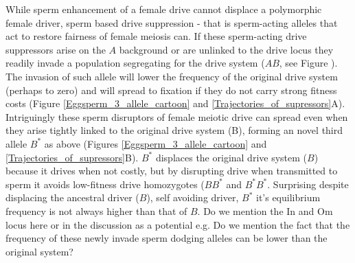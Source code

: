 \documentclass[12pt,letterpaper]{article}
\newcommand{\gc}[1]{{ \color{red} #1}}
\begin{document}
While  sperm enhancement of a female drive cannot displace a polymorphic female driver, sperm based drive suppression - that is sperm-acting alleles that act to restore 
fairness of female meiosis can. 
 If these sperm-acting drive suppressors arise on
	the $A$ background or are unlinked to the drive locus they readily invade a population segregating
for the drive system ($AB$, see Figure ). The invasion of such allele
will lower the frequency of the original drive system (perhaps to zero)
and will spread to fixation if they do not carry strong fitness costs
(Figure \ref{Eggsperm_3_allele_cartoon} and \ref{Trajectories_of_supressors}A). \\

Intriguingly these sperm disruptors of female meiotic drive can spread
	even when they arise tightly linked to the original drive system (B), forming
	an novel third allele $B^*$ as above (Figures \ref{Eggsperm_3_allele_cartoon} and \ref{Trajectories_of_supressors}B). 
$B^*$ displaces the original drive system ($B$) because it drives when not costly, 
	but by disrupting drive when transmitted to sperm it avoids low-fitness drive homozygotes ($BB^*$ and $B^*B^*$. 
Surprising despite displacing the ancestral driver ($B$), self avoiding driver, $B^*$ it's equilibrium frequency is not always higher than that of $B$. 
\gc{Do we mention the In and Om locus here or in the discussion as a
	 potential e.g. Do we mention the fact that the frequency of these
	 newly invade sperm dodging alleles can be lower than the original system?}\\
\end{document}
